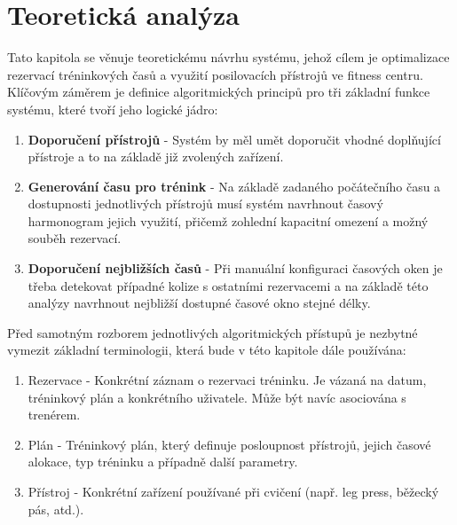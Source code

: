 \chapter{Teoretická analýza} \label{theoreticalAnalysis}
Tato kapitola se věnuje teoretickému návrhu systému, jehož cílem je optimalizace rezervací tréninkových časů a využití posilovacích přístrojů ve fitness centru. Klíčovým záměrem je definice algoritmických principů pro tři základní funkce systému, které tvoří jeho logické jádro:

\begin{enumerate}
    \item \textbf{Doporučení přístrojů} - Systém by měl umět doporučit vhodné doplňující přístroje a to na základě již zvolených zařízení.
    \item \textbf{Generování času pro trénink} - Na základě zadaného počátečního času a dostupnosti jednotlivých přístrojů musí systém navrhnout časový harmonogram jejich využití, přičemž zohlední kapacitní omezení a možný souběh rezervací.
    \item \textbf{Doporučení nejbližších časů} - Při manuální konfiguraci časových oken je třeba detekovat případné kolize s ostatními rezervacemi a na základě této analýzy navrhnout nejbližší dostupné časové okno stejné délky.
\end{enumerate}

Před samotným rozborem jednotlivých algoritmických přístupů je nezbytné vymezit základní terminologii, která bude v této kapitole dále používána:
\begin{enumerate}
    \item Rezervace - Konkrétní záznam o rezervaci tréninku. Je vázaná na datum, tréninkový plán a konkrétního uživatele. Může být navíc asociována s trenérem.
    \item Plán - Tréninkový plán, který definuje posloupnost přístrojů, jejich časové alokace, typ tréninku a případně další parametry.
    \item Přístroj - Konkrétní zařízení používané při cvičení (např. leg press, běžecký pás, atd.).
\end{enumerate}

